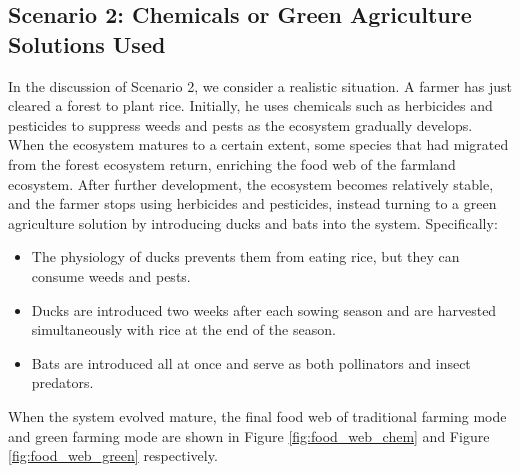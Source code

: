 \documentclass{HZNUMCM}
\begin{document}
      \subsection{Scenario 2: Chemicals or Green Agriculture Solutions Used}
        In the discussion of Scenario 2, we consider a realistic situation. 
        A farmer has just cleared a forest to plant rice. 
        Initially, he uses chemicals such as herbicides and pesticides to suppress weeds and pests as the ecosystem gradually develops. 
        When the ecosystem matures to a certain extent, some species that had migrated from the forest ecosystem return, 
        enriching the food web of the farmland ecosystem. After further development, the ecosystem becomes relatively stable, 
        and the farmer stops using herbicides and pesticides, 
        instead turning to a green agriculture solution by introducing ducks and bats into the system.
        Specifically:
        \begin{itemize}
          \item The physiology of ducks prevents them from eating rice, but they can consume weeds and pests.
          \item Ducks are introduced two weeks after each sowing season and are harvested simultaneously with rice at the end of the season.
          \item Bats are introduced all at once and serve as both pollinators and insect predators.
        \end{itemize}
        When the system evolved mature, the final food web of traditional farming mode and green farming mode are shown in 
        Figure \ref{fig:food_web_chem} and Figure \ref{fig:food_web_green} respectively.
\end{document}
